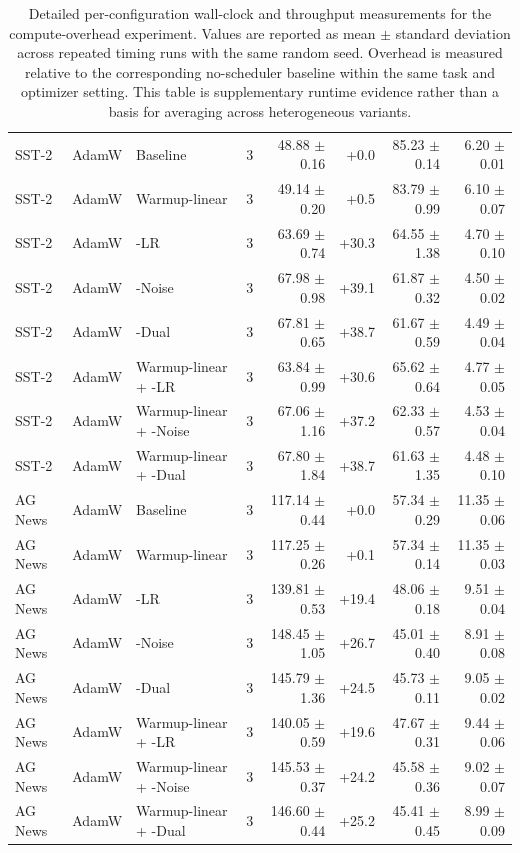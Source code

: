 \begin{table}[htbp]
{\begin{tabular}{lllrrrrr}
\midrule
SST-2 & AdamW & Baseline & 3 & 48.88 $\pm$ 0.16 & +0.0 & 85.23 $\pm$ 0.14 & 6.20 $\pm$ 0.01 \\
SST-2 & AdamW & Warmup-linear & 3 & 49.14 $\pm$ 0.20 & +0.5 & 83.79 $\pm$ 0.99 & 6.10 $\pm$ 0.07 \\
SST-2 & AdamW & \method{}-LR & 3 & 63.69 $\pm$ 0.74 & +30.3 & 64.55 $\pm$ 1.38 & 4.70 $\pm$ 0.10 \\
SST-2 & AdamW & \method{}-Noise & 3 & 67.98 $\pm$ 0.98 & +39.1 & 61.87 $\pm$ 0.32 & 4.50 $\pm$ 0.02 \\
SST-2 & AdamW & \method{}-Dual & 3 & 67.81 $\pm$ 0.65 & +38.7 & 61.67 $\pm$ 0.59 & 4.49 $\pm$ 0.04 \\
SST-2 & AdamW & Warmup-linear + \method{}-LR & 3 & 63.84 $\pm$ 0.99 & +30.6 & 65.62 $\pm$ 0.64 & 4.77 $\pm$ 0.05 \\
SST-2 & AdamW & Warmup-linear + \method{}-Noise & 3 & 67.06 $\pm$ 1.16 & +37.2 & 62.33 $\pm$ 0.57 & 4.53 $\pm$ 0.04 \\
SST-2 & AdamW & Warmup-linear + \method{}-Dual & 3 & 67.80 $\pm$ 1.84 & +38.7 & 61.63 $\pm$ 1.35 & 4.48 $\pm$ 0.10 \\
\midrule
AG News & AdamW & Baseline & 3 & 117.14 $\pm$ 0.44 & +0.0 & 57.34 $\pm$ 0.29 & 11.35 $\pm$ 0.06 \\
AG News & AdamW & Warmup-linear & 3 & 117.25 $\pm$ 0.26 & +0.1 & 57.34 $\pm$ 0.14 & 11.35 $\pm$ 0.03 \\
AG News & AdamW & \method{}-LR & 3 & 139.81 $\pm$ 0.53 & +19.4 & 48.06 $\pm$ 0.18 & 9.51 $\pm$ 0.04 \\
AG News & AdamW & \method{}-Noise & 3 & 148.45 $\pm$ 1.05 & +26.7 & 45.01 $\pm$ 0.40 & 8.91 $\pm$ 0.08 \\
AG News & AdamW & \method{}-Dual & 3 & 145.79 $\pm$ 1.36 & +24.5 & 45.73 $\pm$ 0.11 & 9.05 $\pm$ 0.02 \\
AG News & AdamW & Warmup-linear + \method{}-LR & 3 & 140.05 $\pm$ 0.59 & +19.6 & 47.67 $\pm$ 0.31 & 9.44 $\pm$ 0.06 \\
AG News & AdamW & Warmup-linear + \method{}-Noise & 3 & 145.53 $\pm$ 0.37 & +24.2 & 45.58 $\pm$ 0.36 & 9.02 $\pm$ 0.07 \\
AG News & AdamW & Warmup-linear + \method{}-Dual & 3 & 146.60 $\pm$ 0.44 & +25.2 & 45.41 $\pm$ 0.45 & 8.99 $\pm$ 0.09 \\
\bottomrule
\end{tabular}
}
\caption{Detailed per-configuration wall-clock and throughput measurements for the compute-overhead experiment. Values are reported as mean $\pm$ standard deviation across repeated timing runs with the same random seed. Overhead is measured relative to the corresponding no-scheduler baseline within the same task and optimizer setting. This table is supplementary runtime evidence rather than a basis for averaging across heterogeneous \method{} variants.}
\label{tab:compute_overhead_detailed}
\end{table}
